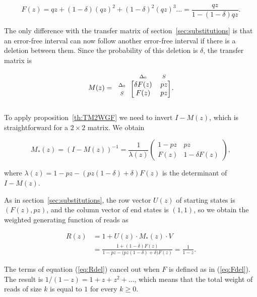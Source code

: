 \documentclass{article}
\newcommand{\smS}{\scriptstyle{S}}
\newcommand{\smDELz}{\scriptstyle{\Delta_0}}
\begin{document}
\begin{equation}
\label{eq:Fdel}
F(z) = qz + (1-\delta)(qz)^2 + (1-\delta)^2(qz)^3 \ldots =
\frac{qz}{1-(1-\delta)qz}.
\end{equation}

The only difference with the transfer matrix of
section~\ref{sec:substitutions} is that an error-free interval can now
follow another error-free interval if there is a deletion between them.
Since the probability of this deletion is $\delta$, the transfer matrix is


\begin{equation*}
M(z) = 
\begin{blockarray}{ccc}
       & \smDELz & \smS \\
\begin{block}{c[cc]}
\smDELz & \delta F(z) & pz \\
\smS    &        F(z) & pz \\
\end{block}
\end{blockarray}.
\end{equation*}

To apply proposition~\ref{th:TM2WGF} we need to invert $I-M(z)$, which is
straightforward for a $2 \times 2$ matrix. We obtain

\begin{equation*}
M_*(z) = (I-M(z))^{-1}=
\frac{1}{\lambda(z)}
\left(
\begin{matrix}
1-pz  & pz              \\
F(z) & 1 -\delta F(z)
\end{matrix}
\right),
\end{equation*}

\noindent
where $\lambda(z) = 1-pz-(pz(1-\delta)+\delta)F(z)$ is the determinant of
$I-M(z)$.

As in section~\ref{sec:substitutions}, the row vector $U(z)$ of starting
states is $(F(z), pz)$, and the column vector of end states is $(1,1)$, so
we obtain the weighted generating function of reads as

\begin{equation}
\label{eq:Rdel}
\begin{split}
R(z) &= 1 + U(z) \cdot M_*(z) \cdot V \\
&= \frac{1+(1-\delta)F(z)} {1-pz - \big(pz(1-\delta) + \delta\big)F(z)}
= \frac{1}{1-z}.
\end{split}
\end{equation}

The terms of equation (\ref{eq:Rdel}) cancel out when $F$ is defined as in
(\ref{eq:Fdel}). The result is $1/(1-z) = 1+z +z^2 + \ldots$, which means
that the total weight of reads of size $k$ is equal to $1$ for every $k
\geq 0$.
\end{document}
